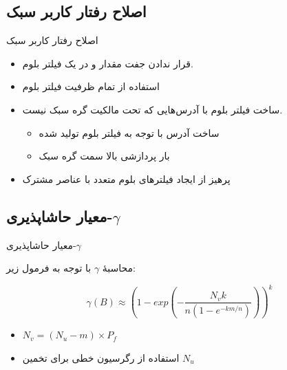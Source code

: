 \documentclass{beamer}
\begin{document}
\subsection{اصلاح رفتار کاربر سبک}
\begin{frame}{اصلاح رفتار کاربر سبک}
	\begin{itemize}
		\item {%
		قرار ندادن جفت مقدار  و  در یک فیلتر بلوم.}
		\item {%
		استفاده از تمام ظرفیت فیلتر بلوم}
		\item {%
		ساخت فیلتر بلوم با آدرس‌هایی که تحت مالکیت گره سبک نیست.
		\begin{itemize}
			\item ساخت آدرس با توجه به فیلتر بلوم تولید شده
			\item بار پردازشی بالا سمت گره سبک
		\end{itemize}	
	}
		\item {%
		پرهیز از ایجاد فیلتر‌های بلوم متعدد با عناصر مشترک
		}
	\end{itemize}
	
	\begin{center}
		{\small {}} 
	\end{center}
\end{frame}
\subsection{%
	معیار حاشاپذیری-$\gamma$}
\begin{frame}{%
		معیار حاشاپذیری-$\gamma$}
	
	محاسبهٔ $\gamma$ با توجه به فرمول زیر:
	
	\begin{equation}
	\gamma \left(B\right) \approx \left(1-exp\left(-\frac{N_vk}{n\left(1-e^{-km/n}\right)}\right)\right)^k
	\label{eq:gamma-deniability}
	\end{equation}
	
	\begin{itemize}
		\item $N_v=(N_u-m)\times P_f$
		\item استفاده از رگرسیون خطی برای تخمین $N_u$
	\end{itemize}
	\begin{center}
		{\small {}}
	\end{center}
\end{frame}
\end{document}
